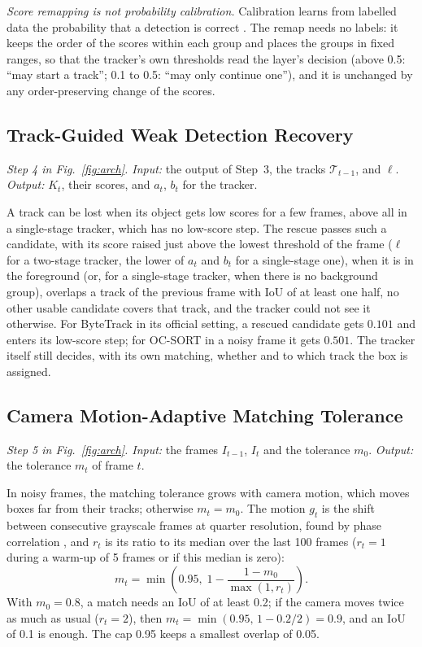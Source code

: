 \documentclass[pdflatex,sn-mathphys-num,iicol]{sn-jnl}
\begin{document}
\emph{Score remapping is not probability calibration.} Calibration learns from labelled data the
probability that a detection is correct \cite{kuppers2020detcalib}. The remap needs no labels: it
keeps the order of the scores within each group and places the groups in fixed ranges, so that the
tracker's own thresholds read the layer's decision (above 0.5: ``may start a track''; 0.1 to 0.5:
``may only continue one''), and it is unchanged by any order-preserving change of the scores.

\subsection{Track-Guided Weak Detection Recovery}\label{sec:rescue}
\emph{Step 4 in Fig.~\ref{fig:arch}. Input:} the output of Step~3, the tracks $\mathcal{T}_{t-1}$,
and $\ell$. \emph{Output:} $K_t$, their scores, and $a_t$, $b_t$ for the tracker.

A track can be lost when its object gets low scores for a few frames, above all in a single-stage
tracker, which has no low-score step. The rescue passes such a candidate, with its score raised just
above the lowest threshold of the frame ($\ell$ for a two-stage tracker, the lower of $a_t$ and $b_t$
for a single-stage one), when it is in the foreground (or, for a single-stage tracker, when there is
no background group), overlaps a track of the previous frame with IoU of at least one half, no other
usable candidate covers that track, and the tracker could not see it otherwise. For ByteTrack in its
official setting, a rescued candidate gets $0.101$ and enters its low-score step; for OC-SORT in a
noisy frame it gets $0.501$. The tracker itself still decides, with its own matching, whether and to
which track the box is assigned.

\subsection{Camera Motion-Adaptive Matching Tolerance}\label{sec:motion}
\emph{Step 5 in Fig.~\ref{fig:arch}. Input:} the frames $I_{t-1}$, $I_t$ and the tolerance $m_0$.
\emph{Output:} the tolerance $m_t$ of frame $t$.

In noisy frames, the matching tolerance grows with camera motion, which moves boxes far from their
tracks; otherwise $m_t=m_0$. The motion $g_t$ is the shift between consecutive grayscale
frames at quarter resolution, found by phase correlation \cite{tong2019fourier}, and $r_t$ is its
ratio to its median over the last 100 frames ($r_t=1$ during a warm-up of 5 frames or if this median
is zero):
\begin{equation}
m_t=\min\!\left(0.95,\;1-\frac{1-m_0}{\max(1,r_t)}\right).
\label{eq:motion}
\end{equation}
With $m_0=0.8$, a match needs an IoU of at least 0.2; if the camera moves twice as much as usual
($r_t=2$), then $m_t=\min(0.95,\,1-0.2/2)=0.9$, and an IoU of 0.1 is enough. The cap 0.95 keeps a
smallest overlap of 0.05.
\end{document}
